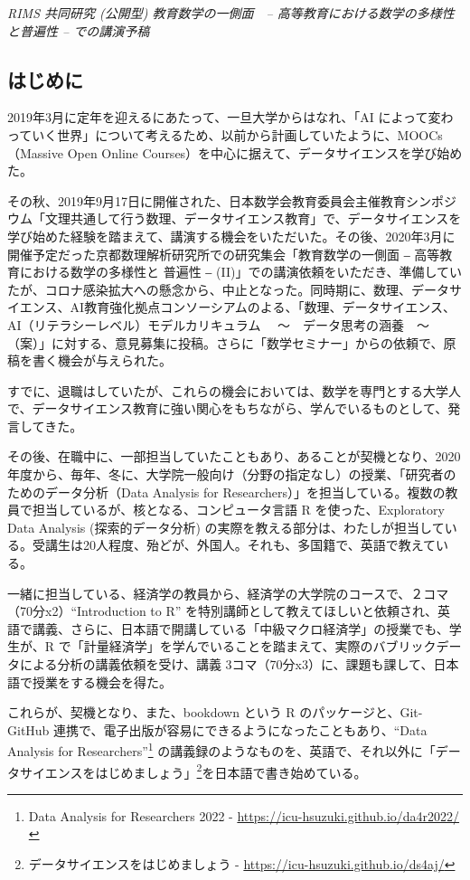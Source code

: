 \documentclass[
]{bxjsbook}
\theoremstyle{definition}
\theoremstyle{definition}
\theoremstyle{definition}
\theoremstyle{definition}
\theoremstyle{remark}
\begin{document}
\emph{RIMS 共同研究 (公開型) 教育数学の一側面　-- 高等教育における数学の多様性と普遍性 -- での講演予稿}

\hypertarget{ux306fux3058ux3081ux306b}{%
\subsection{はじめに}\label{ux306fux3058ux3081ux306b}}

2019年3月に定年を迎えるにあたって、一旦大学からはなれ、「AI によって変わっていく世界」について考えるため、以前から計画していたように、MOOCs（Massive Open Online Courses）を中心に据えて、データサイエンスを学び始めた。

その秋、2019年9月17日に開催された、日本数学会教育委員会主催教育シンポジウム「文理共通して行う数理、データサイエンス教育」で、データサイエンスを学び始めた経験を踏まえて、講演する機会をいただいた。その後、2020年3月に開催予定だった京都数理解析研究所での研究集会「教育数学の一側面 ‒ 高等教育における数学の多様性と 普遍性 ‒ (II)」での講演依頼をいただき、準備していたが、コロナ感染拡大への懸念から、中止となった。同時期に、数理、データサイエンス、AI教育強化拠点コンソーシアムのよる、「数理、データサイエンス、AI（リテラシーレベル）モデルカリキュラム 　～　データ思考の涵養　～（案）」に対する、意見募集に投稿。さらに「数学セミナー」からの依頼で、原稿を書く機会が与えられた。

すでに、退職はしていたが、これらの機会においては、数学を専門とする大学人で、データサイエンス教育に強い関心をもちながら、学んでいるものとして、発言してきた。

その後、在職中に、一部担当していたこともあり、あることが契機となり、2020年度から、毎年、冬に、大学院一般向け（分野の指定なし）の授業、「研究者のためのデータ分析（Data Analysis for Researchers）」を担当している。複数の教員で担当しているが、核となる、コンピュータ言語 R を使った、Exploratory Data Analysis (探索的データ分析) の実際を教える部分は、わたしが担当している。受講生は20人程度、殆どが、外国人。それも、多国籍で、英語で教えている。

一緒に担当している、経済学の教員から、経済学の大学院のコースで、２コマ（70分x2）``Introduction to R'' を特別講師として教えてほしいと依頼され、英語で講義、さらに、日本語で開講している「中級マクロ経済学」の授業でも、学生が、R で「計量経済学」を学んでいることを踏まえて、実際のバブリックデータによる分析の講義依頼を受け、講義 3コマ（70分x3）に、課題も課して、日本語で授業をする機会を得た。

これらが、契機となり、また、bookdown という R のパッケージと、Git-GitHub 連携で、電子出版が容易にできるようになったこともあり、``Data Analysis for Researchers''\footnote{Data Analysis for Researchers 2022 - \url{https://icu-hsuzuki.github.io/da4r2022/}} の講義録のようなものを、英語で、それ以外に「データサイエンスをはじめましょう」\footnote{データサイエンスをはじめましょう - \url{https://icu-hsuzuki.github.io/ds4aj/}}を日本語で書き始めている。
\end{document}
